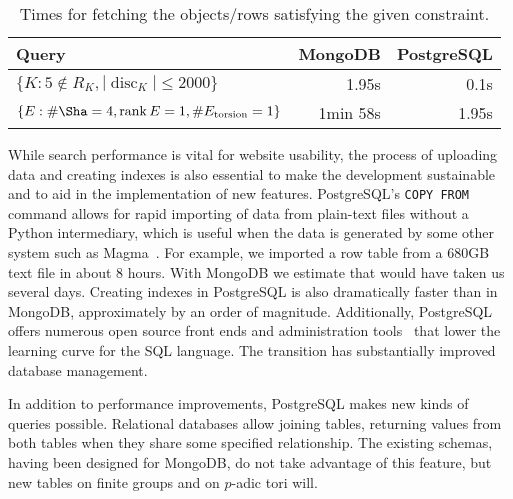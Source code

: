 \documentclass{amsart}
\DeclareMathOperator{\rank}{rank}
\begin{document}
\begin{table}[h!]
  \begin{center}
  \begin{tabular}{l|r|r}
Query & MongoDB & PostgreSQL\\
\hline
$\{K : 5 \notin R_K, |\operatorname{disc}_K| \leq 2000\}$ & 1.95s & 0.1s\\
$\{E : \# \Sha = 4, \rank E = 1, \# E_{\text{torsion}} = 1\}$ & 1min 58s & 1.95s\\
\end{tabular}
\caption{Times for fetching the objects/rows satisfying the given constraint.}
\label{table:indexless}
\end{center}
\end{table}



While search performance is vital for website usability, the process of uploading data and creating indexes is also essential to make the development sustainable and to aid in the implementation of new features.
PostgreSQL's \texttt{COPY FROM} command allows for rapid importing of data from plain-text files without a Python intermediary, which is useful when the data is generated by some other system such as Magma~\cite{magma}.
For example, we imported a  row table from a 680GB text file in about 8 hours.
With MongoDB we estimate that would have taken us several days.
Creating indexes in PostgreSQL is also dramatically faster than in MongoDB, approximately by an order of magnitude.
Additionally, PostgreSQL offers numerous open source front ends and administration tools~\cite{pgadmin,adminer} that lower the learning curve for the SQL language.
The transition has substantially improved database management.

In addition to performance improvements, PostgreSQL makes new kinds of queries possible.
Relational databases allow joining tables, returning values from both tables when they share some specified relationship.
The existing schemas, having been designed for MongoDB, do not take advantage of this feature, but new tables on finite groups and on $p$-adic tori will.
\end{document}
